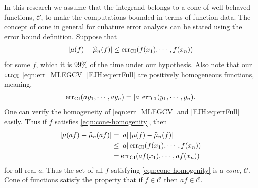 \documentclass{iitthesis}          %
\newcommand{\hmu}{\widehat{\mu}}
\newcommand{\err}{\textup{err}}
\def\abs#1{\ensuremath{\left \lvert #1 \right \rvert}}
\begin{document}
In this research we assume that the integrand belongs to a cone of well-behaved functions, $\mathscr{C}$, to make the computations bounded in terms of function data. The concept of cone in general for cubature error analysis can be stated using the error bound definition. 
Suppose that 
\begin{align}
\label{eqn:cone-homogenity}
\abs{\mu(f) - \hmu_n(f)} \le \err_{\textup{CI}} (f(x_1), \cdots, f(x_n))
\end{align}
for some $f$, which it is 99\% of the time under our hypothesis. Also note that our $\err_{\textup{CI}}$ \eqref{eqn:err_MLEGCV} \eqref{FJH:eq:errFull} are positively homogeneous functions, meaning, 
\begin{align*}
\err_{\textup{CI}} (a y_1, \cdots, a y_n) = \abs{a} \err_{\textup{CI}} ( y_1, \cdots,  y_n).
\end{align*}
One can verify the homogeneity of \eqref{eqn:err_MLEGCV} and \eqref{FJH:eq:errFull} easily.
Thus if $f$ satisfies \eqref{eqn:cone-homogenity}, then
\begin{align*}
\abs{\mu(af) - \hmu_n(af)} &= \abs{a} \abs{\mu(f) - \hmu_n(f)} \\
& \le \abs{a} \err_{\textup{CI}} (f(x_1), \cdots, f(x_n) ) \\
& = \err_{\textup{CI}} (a f(x_1), \cdots, a f(x_n))
\end{align*}
for all real $a$. Thus the set of all $f$ satisfying \eqref{eqn:cone-homogenity} is a \emph{cone}, $\mathscr{C}$. Cone of functions satisfy the property that if $f \in \mathscr{C}$ then $af \in \mathscr{C}$.

\end{document}

